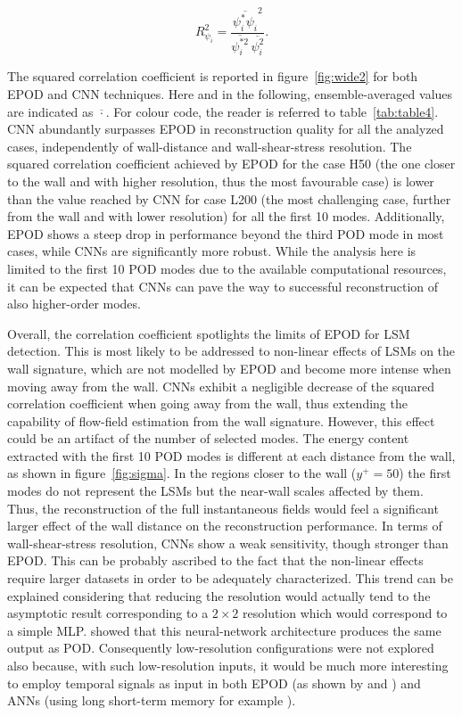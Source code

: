 \begin{equation}
   R^2_{\psi_i} = \frac{\overline{\psi^*_i\psi_i}^2}{\overline{\psi_i^{*2}}\, \overline{\psi_i^2}}.
\end{equation}{}

The squared correlation coefficient is reported in figure~\ref{fig:wide2} for both EPOD and CNN techniques.
Here and in the following, ensemble-averaged values are indicated as $\overline{\cdot}$.
For colour code, the reader is referred to table~\ref{tab:table4}.
CNN abundantly surpasses EPOD in reconstruction quality for all the analyzed cases, independently of wall-distance and wall-shear-stress resolution.
The squared correlation coefficient achieved by EPOD for the case H50 (the one closer to the wall and with higher resolution, thus the most favourable case) is lower than the value reached by CNN for case L200 (the most challenging case, further from the wall and with lower resolution) for all the first 10 modes.
Additionally, EPOD shows a steep drop in performance beyond the third POD mode in most cases, while CNNs are significantly more robust.
While the analysis here is limited to the first 10 POD modes due to the available computational resources, it can be expected that CNNs can pave the way to successful reconstruction of also higher-order modes.

Overall, the correlation coefficient spotlights the limits of EPOD for LSM detection.
This is most likely to be addressed to non-linear effects of LSMs on the wall signature, which are not modelled by EPOD and become more intense when moving away from the wall.
CNNs exhibit a  negligible decrease of the squared correlation coefficient when going away from the wall, thus extending the capability of flow-field estimation from the wall signature.
However, this effect could be an artifact of the number of selected modes. The energy content extracted with the first 10 POD modes is different at each distance from the wall, as shown in figure~\ref{fig:sigma}.
In the regions closer to the wall ($y^+=50$) the first modes do not represent the LSMs but the near-wall scales affected by them. Thus, the reconstruction of the full instantaneous fields would feel a significant larger effect of the wall distance on the reconstruction performance.
In terms of wall-shear-stress resolution, CNNs show a weak sensitivity, though stronger than EPOD.
This can be probably ascribed to the fact that the non-linear effects require larger datasets in order to be adequately characterized.
This trend can be explained considering that reducing the resolution would actually tend to the asymptotic result corresponding to a $2\times 2$ resolution which would correspond to a simple MLP.
\citet{baldi1989neural} showed that this neural-network architecture produces the same output as POD.
Consequently low-resolution configurations were not explored also because, with such low-resolution inputs, it would be much more interesting to employ temporal signals as input in both EPOD (as shown by \citet{discetti2019characterization} and \citet{discetti2018estimation}) and ANNs (using long short-term memory for example \citep{deng2019time}).

